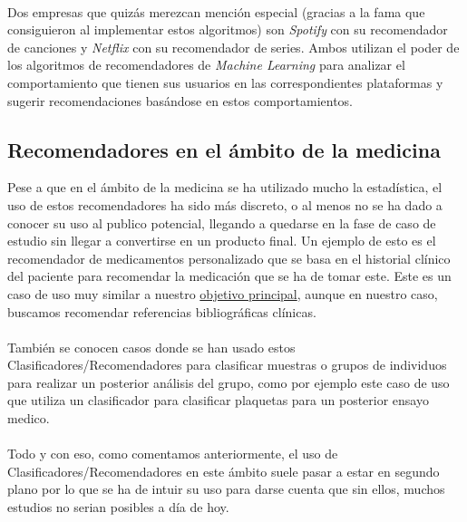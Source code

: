 \paragraph{}
Dos empresas que quizás merezcan mención especial (gracias a la fama que consiguieron al implementar estos algoritmos) son \textit{Spotify}\cite{ref:music_recommender} con su recomendador de canciones y \textit{Netflix}\cite{ref:netflix} con su recomendador de series. Ambos utilizan el poder de los algoritmos de recomendadores de \textit{Machine Learning} para analizar el comportamiento que tienen sus usuarios en las correspondientes plataformas y sugerir recomendaciones basándose en estos comportamientos.


\subsection{Recomendadores en el ámbito de la medicina}
Pese a que en el ámbito de la medicina se ha utilizado mucho la estadística, el uso de estos recomendadores ha sido más discreto, o al menos no se ha dado a conocer su uso al publico potencial, llegando a quedarse en la fase de caso de estudio sin llegar a convertirse en un producto final. Un ejemplo de esto es el recomendador de medicamentos personalizado\cite{ref:refer_medical_prescriptions} que se basa en el historial clínico del paciente para recomendar la medicación que se ha de tomar este. Este es un caso de uso muy similar a nuestro \hyperref[op:OP1]{objetivo principal}, aunque en nuestro caso, buscamos recomendar referencias bibliográficas clínicas.

\paragraph{}
También se conocen casos donde se han usado estos Clasificadores/Recomendadores para clasificar muestras o grupos de individuos para realizar un posterior análisis del grupo, como por ejemplo este caso de uso\cite{ref:refer_classify_plaquetas} que utiliza un clasificador para clasificar plaquetas para un posterior ensayo medico.

\paragraph{}
Todo y con eso, como comentamos anteriormente, el uso de Clasificadores/Recomendadores en este ámbito suele pasar a estar en segundo plano por lo que se ha de intuir su uso para darse cuenta que sin ellos, muchos estudios no serian posibles a día de hoy.

